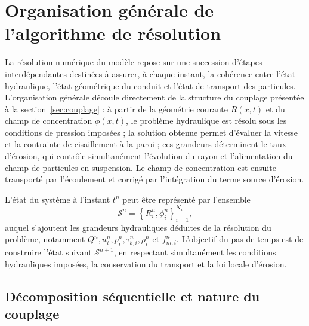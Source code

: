 \documentclass[11pt,a4paper]{report}
\begin{document}


\section{Organisation générale de l'algorithme de résolution}
\label{sec:algo}

La résolution numérique du modèle repose sur une succession d'étapes interdépendantes destinées à
assurer, à chaque instant, la cohérence entre l'état hydraulique, l'état géométrique du conduit et l'état
de transport des particules. L'organisation générale découle directement de la structure du couplage
présentée à la section~\ref{sec:couplage} : à partir de la géométrie courante \(R(x,t)\) et du champ de
concentration \(\phi(x,t)\), le problème hydraulique est résolu sous les conditions de pression imposées ;
la solution obtenue permet d'évaluer la vitesse et la contrainte de cisaillement à la paroi ; ces grandeurs
déterminent le taux d'érosion, qui contrôle simultanément l'évolution du rayon et l'alimentation du champ
de particules en suspension. Le champ de concentration est ensuite transporté par l'écoulement et corrigé
par l'intégration du terme source d'érosion.

L'état du système à l'instant \(t^n\) peut être représenté par l'ensemble
\begin{equation}
\mathcal{S}^n = \left\{R_i^n, \phi_i^n\right\}_{i=1}^{N_x},
\label{eq:etat}
\end{equation}
auquel s'ajoutent les grandeurs hydrauliques déduites de la résolution du problème, notamment
\(Q^n, u_i^n, p_i^n, \tau_{b,i}^n, \rho_i^n\) et \(f_{m,i}^n\). L'objectif du pas de temps est de construire
l'état suivant \(\mathcal{S}^{n+1}\), en respectant simultanément les conditions hydrauliques imposées, la
conservation du transport et la loi locale d'érosion.

\subsection{Décomposition séquentielle et nature du couplage}
\end{document}
